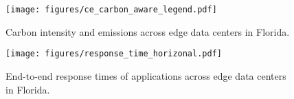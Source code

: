 
\begin{figure}[t]
    \centering
    \texttt{[image: figures/ce\_carbon\_aware\_legend.pdf]}\\
    
    \caption{Carbon intensity and emissions across edge data centers in Florida.}
    \label{fig:carbon_emission_ts}
\end{figure}

\begin{figure}[t]
    \centering
    \texttt{[image: figures/response\_time\_horizonal.pdf]}
    \caption{End-to-end response times of applications across edge data centers in Florida.}
    \label{fig:response_time_ts}
\end{figure}




